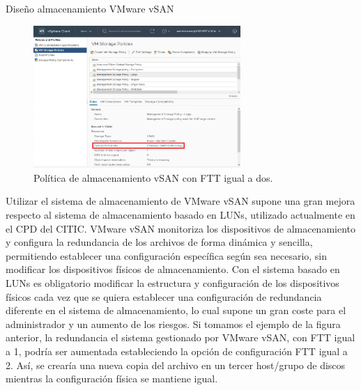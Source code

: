 \begin{subsubsection}{Diseño almacenamiento VMware vSAN}
\begin{figure}[h]
    \label{fig:vSAN-config-FTT}
  \end{figure}
  \FloatBarrier
  \begin{figure}[h]
    \centering
    \includegraphics[width=0.7\textwidth]{imaxes/pruebaconcepto/vsan-policies.png}
    \caption{Política de almacenamiento vSAN con FTT igual a dos.}
    \label{fig:vSAN-policies}
  \end{figure}
  \FloatBarrier
  Utilizar el sistema de almacenamiento de VMware vSAN supone una gran mejora respecto al sistema de almacenamiento basado en LUNs, utilizado actualmente en el CPD del CITIC. VMware vSAN monitoriza los dispositivos de almacenamiento y configura la redundancia de los archivos de forma dinámica y sencilla, permitiendo establecer una configuración específica según sea necesario, sin modificar los dispositivos físicos de almacenamiento. Con el sistema basado en LUNs es obligatorio modificar la estructura y configuración de los dispositivos físicos cada vez que se quiera establecer una configuración de redundancia diferente en el sistema de almacenamiento, lo cual supone un gran coste para el administrador y un aumento de los riesgos. Si tomamos el ejemplo de la figura anterior, la redundancia el sistema gestionado por VMware vSAN, con FTT igual a 1, podría ser aumentada estableciendo la opción de configuración FTT igual a 2. Así, se crearía una nueva copia del archivo en un tercer host/grupo de discos mientras la configuración física se mantiene igual.

\end{subsubsection}

